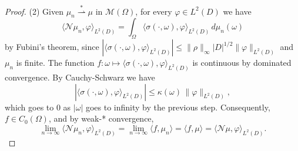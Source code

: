 \documentclass[11pt]{amsart}
\theoremstyle{definition}
\theoremstyle{remark}
\begin{document}
\begin{proof}
(2) Given $\mu_n \overset{*}{\rightharpoonup} \mu$ in $\mathcal{M}(\Omega)$, for every $\varphi \in L^2(D)$ we have
\begin{equation*}
	\langle \mathcal{N}\mu_n, \varphi\rangle_{L^2(D)} = \int_\Omega \langle \sigma(\cdot,\omega), \varphi\rangle_{L^2(D)} \, d\mu_n(\omega)
\end{equation*}
by Fubini's theorem, since
$|\langle \sigma(\cdot,\omega),\varphi\rangle_{L^2(D)}|
\le \|\rho\|_\infty |D|^{1/2}\|\varphi\|_{L^2(D)}$ and $\mu_n$ is finite.
The function $f: \omega \mapsto \langle \sigma(\cdot, \omega), \varphi\rangle_{L^2(D)}$ is continuous by dominated convergence.
By Cauchy-Schwarz we have
\begin{equation*} 
	|\langle \sigma(\cdot,\omega), \varphi\rangle_{L^2(D)}| \le \kappa(\omega)\, \|\varphi\|_{L^2(D)},
\end{equation*}
which goes to 0 as $|\omega|$ goes to infinity by the previous step.
Consequently, $f \in C_0(\Omega)$, and by weak-* convergence,
\begin{equation*}
	\lim_{n \rightarrow \infty}  \langle \mathcal{N}\mu_n, \varphi\rangle_{L^2(D)}
	= \lim_{n \rightarrow \infty} \langle f, \mu_n \rangle
	= \langle f, \mu \rangle
	= \langle \mathcal{N}\mu, \varphi\rangle_{L^2(D)}.
\end{equation*}
\end{proof}
\end{document}
